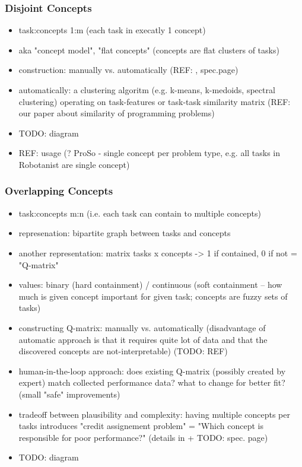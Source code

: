 \subsubsection{\textbf{Disjoint Concepts}}
\begin{itemize}
\item task:concepts 1:m (each task in execatly 1 concept)
\item aka "concept model", "flat concepts" (concepts are flat clusters of tasks)
\item construction: manually vs. automatically (REF: \cite{rihak-phd}, spec.page)
\item automatically: a clustering algoritm (e.g. k-means, k-medoids, spectral clustering)
  operating on task-features or task-task similarity matrix
  (REF: our paper about similarity of programming problems)
\item TODO: diagram
\item REF: usage (? ProSo - single concept per problem type, e.g. all tasks in Robotanist are single concept)
\end{itemize}


\subsubsection{\textbf{Overlapping Concepts}}
\begin{itemize}
\item task:concepts m:n (i.e. each task can contain to multiple concepts)
\item represenation: bipartite graph between tasks and concepts
\item another representation: matrix tasks x concepts -> 1 if contained, 0 if not = "Q-matrix"
\item values: binary (hard containment) / continuous (soft containment --
  how much is given concept important for given task; concepts are fuzzy sets of tasks)
\item constructing Q-matrix: manually vs. automatically
  (disadvantage of automatic approach is that it requires quite lot of data and
    that the discovered concepts are not-interpretable) (TODO: REF)
\item human-in-the-loop approach: does existing Q-matrix (possibly created by
  expert) match collected performance data? what to change for better fit?
    (small "safe" improvements)
\item tradeoff between plausibility and complexity:
  having multiple concepts per tasks introduces "credit assignement problem"
  = "Which concept is responsible for poor performance?"
  (details in \cite{pelanek-learner-modeling} + TODO: spec. page)
\item TODO: diagram

\end{itemize}




